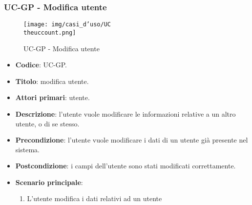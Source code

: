 \subsubsection{UC\theuccount-GP - Modifica utente}
		\begin{figure}[H]
			\centering
				\texttt{[image: img/casi\_d'uso/UC\\theuccount.png]}\\
			\caption{UC\theuccount-GP - Modifica utente}
		\end{figure}
	\begin{itemize}
		\item \textbf{Codice}: UC\theuccount-GP.
		\item \textbf{Titolo}: modifica utente.
		\item \textbf{Attori primari}: utente.
		\item \textbf{Descrizione}: l’utente vuole modificare le informazioni relative a un altro utente, o di se stesso.
		\item \textbf{Precondizione}: l'utente vuole modificare i dati di un utente già presente nel sistema.
		\item \textbf{Postcondizione}: i campi dell'utente sono stati modificati correttamente.
		\item \textbf{Scenario principale}:
		\begin{enumerate}
			\item L'utente modifica i dati relativi ad un utente
		\end{enumerate}
	\end{itemize}


